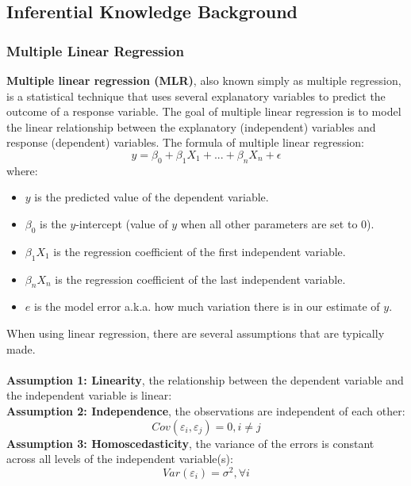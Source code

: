 \documentclass[a4paper]{article}
\theoremstyle{definition}
\begin{document}
\subsection{Inferential Knowledge Background}
\subsubsection{Multiple Linear Regression}
\textbf{Multiple linear regression (MLR)}, also known simply as multiple regression, is a statistical technique that uses several explanatory variables to predict the outcome of a response variable. The goal of multiple linear regression is to model the linear relationship between the explanatory (independent) variables and response (dependent) variables. The formula of multiple linear regression:
\begin{equation*}
    y = \beta_{0}+ \beta_{1} X_{1} + ... + \beta_{n}  X_{n} + \epsilon
\end{equation*}
where:
\begin{itemize}
    \item $y$ is the predicted value of the dependent variable.
    \item $\beta_{0}$ is the $y$-intercept (value of $y$ when all other parameters are set to 0).
    \item $\beta_{1} X_{1}$ is the regression coefficient of the first independent variable.
    \item $\beta_{n} X_{n}$ is the regression coefficient of the last independent variable.
    \item $e$ is the model error a.k.a. how much variation there is in our estimate of $y$.
\end{itemize}
When using linear regression, there are several assumptions that are typically made.\\
\\
\textbf{Assumption 1: Linearity}, the relationship between the dependent variable and the independent variable is linear:\\
\textbf{Assumption 2: Independence}, the observations are independent of each other:
\begin{equation*}
    Cov(\varepsilon_{i},\varepsilon_{j}) = 0, i\neq j
\end{equation*}
\textbf{Assumption 3: Homoscedasticity}, the variance of the errors is constant across all levels of the independent variable(s):
\begin{equation*}
    Var(\varepsilon_{i}) = \sigma^2, \forall i
\end{equation*}
\end{document}
